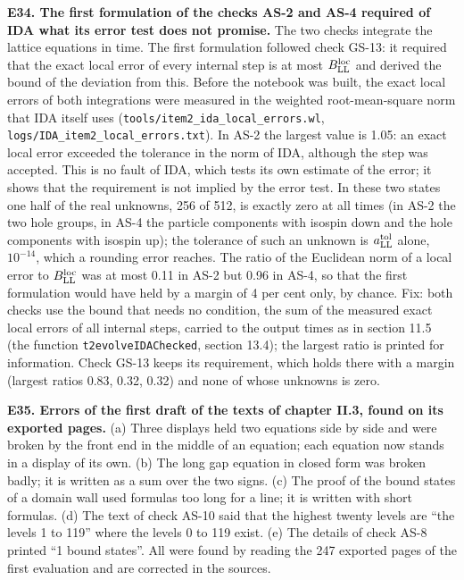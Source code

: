 \documentclass[
  10pt,
]{article}
\begin{document}
\textbf{E34. The first formulation of the checks AS-2 and AS-4 required
of IDA what its error test does not promise.} The two checks integrate
the lattice equations in time. The first formulation followed check
GS-13: it required that the exact local error of every internal step is
at most \(B^{\rm loc}_{\rm LL}\) and derived the bound of the deviation
from this. Before the notebook was built, the exact local errors of both
integrations were measured in the weighted root-mean-square norm that
IDA itself uses (\texttt{tools/item2\_ida\_local\_errors.wl},
\texttt{logs/IDA\_item2\_local\_errors.txt}). In AS-2 the largest value
is 1.05: an exact local error exceeded the tolerance in the norm of IDA,
although the step was accepted. This is no fault of IDA, which tests its
own estimate of the error; it shows that the requirement is not implied
by the error test. In these two states one half of the real unknowns,
256 of 512, is exactly zero at all times (in AS-2 the two hole groups,
in AS-4 the particle components with isospin down and the hole
components with isospin up); the tolerance of such an unknown is
\(a^{\rm tol}_{\rm LL}\) alone, \(10^{-14}\), which a rounding error
reaches. The ratio of the Euclidean norm of a local error to
\(B^{\rm loc}_{\rm LL}\) was at most 0.11 in AS-2 but 0.96 in AS-4, so
that the first formulation would have held by a margin of 4 per cent
only, by chance. Fix: both checks use the bound that needs no condition,
the sum of the measured exact local errors of all internal steps,
carried to the output times as in section 11.5 (the function
\texttt{t2evolveIDAChecked}, section 13.4); the largest ratio is printed
for information. Check GS-13 keeps its requirement, which holds there
with a margin (largest ratios 0.83, 0.32, 0.32) and none of whose
unknowns is zero.

\textbf{E35. Errors of the first draft of the texts of chapter II.3,
found on its exported pages.} (a) Three displays held two equations side
by side and were broken by the front end in the middle of an equation;
each equation now stands in a display of its own. (b) The long gap
equation in closed form was broken badly; it is written as a sum over
the two signs. (c) The proof of the bound states of a domain wall used
formulas too long for a line; it is written with short formulas. (d) The
text of check AS-10 said that the highest twenty levels are ``the levels
1 to 119'' where the levels 0 to 119 exist. (e) The details of check
AS-8 printed ``1 bound states''. All were found by reading the 247
exported pages of the first evaluation and are corrected in the sources.
\end{document}
